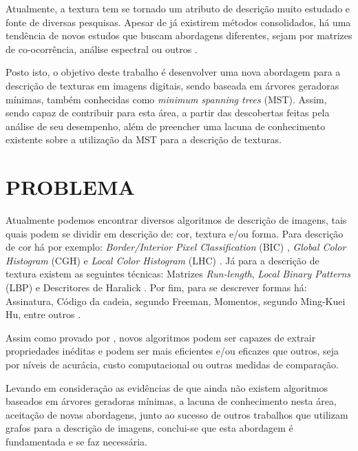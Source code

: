 \par Atualmente, a textura tem se tornado um atributo de descrição muito estudado e fonte de diversas pesquisas. Apesar de já existirem métodos consolidados, há uma tendência de novos estudos que buscam abordagens diferentes, sejam por matrizes de co-ocorrência, análise espectral ou outros \cite{jarbas-analise-textura}. 

\par Posto isto, o objetivo deste trabalho é desenvolver uma nova abordagem para a descrição de texturas em imagens digitais, sendo baseada em árvores geradoras mínimas, também conhecidas como \textit{minimum spanning trees} (MST). Assim, sendo capaz de contribuir para esta área, a partir das descobertas feitas pela análise de seu desempenho, além de preencher uma lacuna de conhecimento existente sobre a utilização da MST para a descrição de texturas.


\section{PROBLEMA}
\label{sec:problema}

\par Atualmente podemos encontrar diversos algoritmos de descrição de imagens, tais quais podem se dividir em descrição de: cor, textura e/ou forma. Para descrição de cor há por exemplo: \textit{Border/Interior Pixel Classification} (BIC) \cite{bic-stehling2002compact}, \textit{Global Color Histogram} (CGH) \cite{cgh-stricker1995similarity} e \textit{Local Color Histogram} (LHC) \cite{lhc-smith1996local}. Já para a descrição de textura existem as seguintes técnicas: Matrizes \textit{Run-length}, \textit{Local Binary Patterns} (LBP) \cite{lbp-guo2010rotation} e  Descritores de Haralick \cite{haralick1973textural}. Por fim, para se descrever formas há: Assinatura, Código da cadeia, segundo Freeman, Momentos, segundo Ming-Kuei Hu, entre outros \cite{Gonzalez2009}.
\par Assim como provado por , novos algoritmos podem ser capazes de extrair propriedades inéditas e podem ser mais eficientes e/ou eficazes que outros, seja por níveis de acurácia, custo computacional ou outras medidas de comparação.
\par Levando em consideração as evidências de que ainda não existem algoritmos baseados em árvores geradoras mínimas, a lacuna de conhecimento nesta área, aceitação de novas abordagens, junto ao sucesso de outros trabalhos que utilizam grafos para a descrição de imagens, conclui-se que esta abordagem é fundamentada e se faz necessária.

